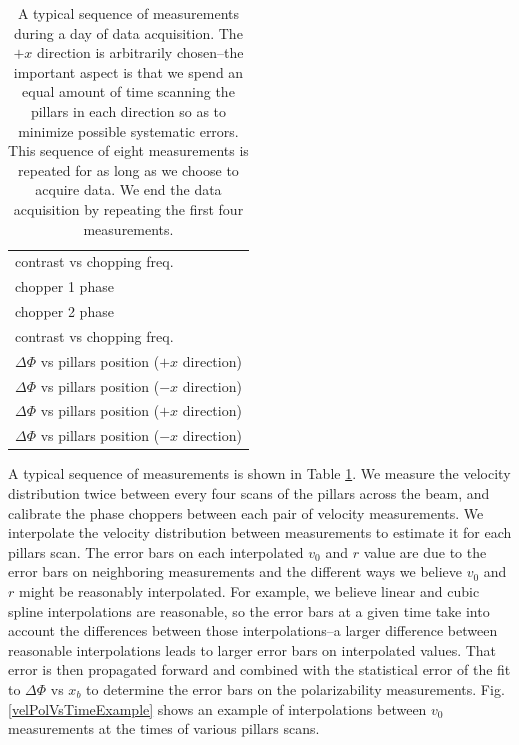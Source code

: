 \documentclass[twocolumn, prl,showpacs,superscriptaddress]{revtex4-1}   %
\newcommand{\figref}[1]{Fig. \ref{#1}}
\begin{document}
\begingroup
\begin{table}
\caption{\label{schedule}A typical sequence of measurements during a day of data acquisition. The $+x$ direction is arbitrarily chosen--the important aspect is that we spend an equal amount of time scanning the pillars in each direction so as to minimize possible systematic errors. This sequence of eight measurements is repeated for as long as we choose to acquire data. We end the data acquisition by repeating the first four measurements.}
\begin{center}
\begin{tabular}{l}
\hline
contrast vs chopping freq. \\
chopper 1 phase \\
chopper 2 phase \\
contrast vs chopping freq. \\
$\Delta\Phi$ vs pillars position ($+x$ direction) \\
$\Delta\Phi$ vs pillars position ($-x$ direction) \\
$\Delta\Phi$ vs pillars position ($+x$ direction) \\
$\Delta\Phi$ vs pillars position ($-x$ direction) \\
\hline
\end{tabular}
\end{center}
\end{table}
\endgroup

A typical sequence of measurements is shown in Table \ref{schedule}.
We measure the velocity distribution twice between every four scans of the pillars across the beam, and calibrate the phase choppers between each pair of velocity measurements.
We interpolate the velocity distribution between measurements to estimate it for each pillars scan. The error bars on each interpolated $v_0$ and $r$ value are due to the error bars on neighboring measurements and the different ways we believe $v_0$ and $r$ might be reasonably interpolated. For example, we believe linear and cubic spline interpolations are reasonable, so the error bars at a given time take into account the differences between those interpolations--a larger difference between reasonable interpolations leads to larger error bars on interpolated values. That error is then propagated forward and combined with the statistical error of the fit to $\Delta\Phi$ vs $x_b$ to determine the error bars on the polarizability measurements. \figref{velPolVsTimeExample} shows an example of interpolations between $v_0$ measurements at the times of various pillars scans.
\end{document}
